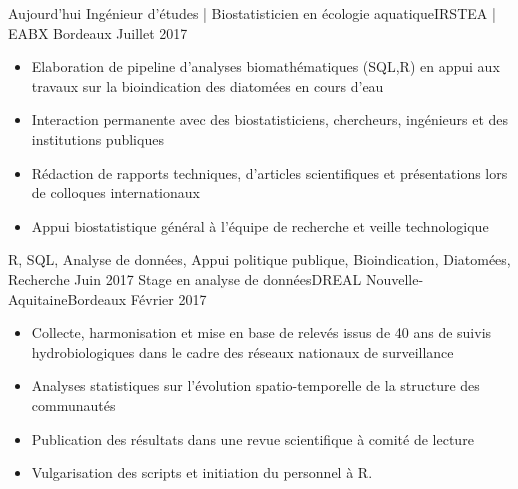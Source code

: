 \documentclass[localFont,alternative]{yaac-another-awesome-cv}
\begin{document}
\begin{experiences}
  \experience
    {Aujourd'hui}   {Ingénieur d'études | Biostatisticien en écologie aquatique}{IRSTEA | EABX }{Bordeaux}
    {Juillet 2017} {
                      \begin{itemize}                    
                        \item Elaboration de pipeline d’analyses biomathématiques (SQL,R) en appui aux travaux sur la bioindication des  diatomées en cours d'eau
                        \item Interaction permanente avec des biostatisticiens, chercheurs, ingénieurs et des institutions publiques 
                        \item Rédaction de rapports techniques, d'articles scientifiques et présentations lors de colloques internationaux
                        \item Appui biostatistique général à l'équipe de recherche et veille technologique                                                                         
                      \end{itemize}
                    }
                    {R, SQL, Analyse de données, Appui politique publique, Bioindication, Diatomées, Recherche}
  \emptySeparator
  \experience
    {Juin 2017} {Stage en analyse de données}{DREAL Nouvelle-Aquitaine}{Bordeaux}
    {Février 2017}    {
                      \begin{itemize}              
                        \item Collecte, harmonisation et mise en base de relevés issus de 40 ans de suivis hydrobiologiques dans le cadre des réseaux nationaux de surveillance               
                        \item Analyses statistiques sur l’évolution spatio-temporelle de la structure des communautés 
                        \item Publication des résultats dans une revue scientifique à comité de lecture    
                        \item Vulgarisation des scripts et initiation du personnel à R.  
                                                

\end{itemize}}
\end{experiences}
\end{document}
